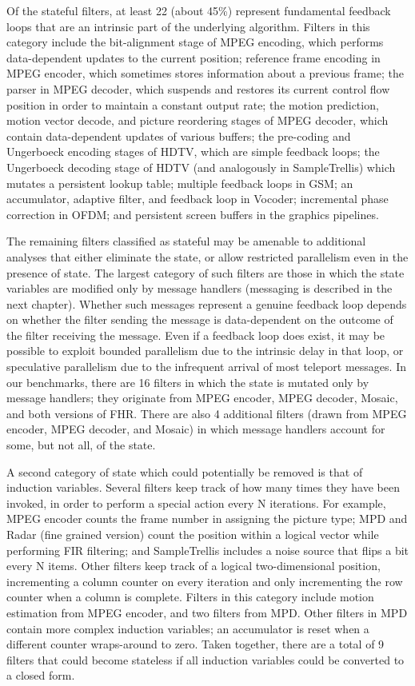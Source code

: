 Of the stateful filters, at least 22 (about 45\%) represent
fundamental feedback loops that are an intrinsic part of the
underlying algorithm.  Filters in this category include the
bit-alignment stage of MPEG encoding, which performs data-dependent
updates to the current position; reference frame encoding in MPEG
encoder, which sometimes stores information about a previous frame;
the parser in MPEG decoder, which suspends and restores its current
control flow position in order to maintain a constant output rate; the
motion prediction, motion vector decode, and picture reordering stages
of MPEG decoder, which contain data-dependent updates of various
buffers; the pre-coding and Ungerboeck encoding stages of HDTV, which
are simple feedback loops; the Ungerboeck decoding stage of HDTV (and
analogously in SampleTrellis) which mutates a persistent lookup table;
multiple feedback loops in GSM; an accumulator, adaptive filter, and
feedback loop in Vocoder; incremental phase correction in OFDM; and
persistent screen buffers in the graphics pipelines.

The remaining filters classified as stateful may be amenable to
additional analyses that either eliminate the state, or allow
restricted parallelism even in the presence of state.  The largest
category of such filters are those in which the state variables are
modified only by message handlers (messaging is described in the next
chapter).  Whether such messages represent a genuine feedback loop
depends on whether the filter sending the message is data-dependent on
the outcome of the filter receiving the message.  Even if a feedback
loop does exist, it may be possible to exploit bounded parallelism due
to the intrinsic delay in that loop, or speculative parallelism due to
the infrequent arrival of most teleport messages.  In our benchmarks,
there are 16 filters in which the state is mutated only by message
handlers; they originate from MPEG encoder, MPEG decoder, Mosaic, and
both versions of FHR.  There are also 4 additional filters (drawn from
MPEG encoder, MPEG decoder, and Mosaic) in which message handlers
account for some, but not all, of the state.

A second category of state which could potentially be removed is that
of induction variables.  Several filters keep track of how many times
they have been invoked, in order to perform a special action every N
iterations.  For example, MPEG encoder counts the frame number in
assigning the picture type; MPD and Radar (fine grained version) count
the position within a logical vector while performing FIR filtering;
and SampleTrellis includes a noise source that flips a bit every N
items.  Other filters keep track of a logical two-dimensional
position, incrementing a column counter on every iteration and only
incrementing the row counter when a column is complete.  Filters in
this category include motion estimation from MPEG encoder, and two
filters from MPD.  Other filters in MPD contain more complex induction
variables; an accumulator is reset when a different counter
wraps-around to zero.  Taken together, there are a total of 9 filters
that could become stateless if all induction variables could be
converted to a closed form.

